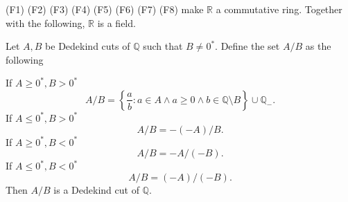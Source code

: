 (F1) (F2) (F3) (F4) (F5) (F6) (F7) (F8) make $\mathbb{R}$ a commutative ring. Together with the following, $\mathbb{R}$ is a field.

\begin{theorem}\label{theorem:chapter1:division}
    Let $A, B$ be Dedekind cuts of $\mathbb{Q}$ such that $B\ne {0}^{*}$. Define the set $A/B$ as the following

    \noindent If $A\ge {0}^{*}, B > {0}^{*}$
    \[
        A/B = \left\{ \frac{a}{b} : a\in A\land a\ge 0\land b\in\mathbb{Q}\setminus B \right\}\cup\mathbb{Q}_{-}.
    \]
    If $A\le {0}^{*}, B > {0}^{*}$
    \[
        A/B = -(-A)/B.
    \]
    If $A\ge {0}^{*}, B < {0}^{*}$
    \[
        A/B = -A/(-B).
    \]
    If $A\le {0}^{*}, B < {0}^{*}$
    \[
        A/B = (-A)/(-B).
    \]
    Then $A/B$ is a Dedekind cut of $\mathbb{Q}$.
\end{theorem}

